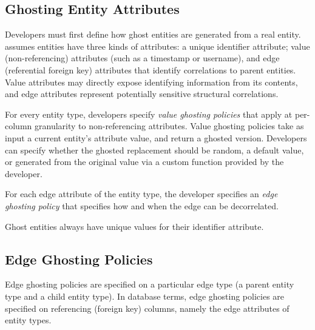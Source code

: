\subsection{Ghosting Entity Attributes}
Developers must first define how ghost entities are generated from a real entity.
\sys assumes entities have three kinds of attributes: a unique identifier attribute; 
value (non-referencing) attributes (such as a timestamp or username), and 
edge (referential foreign key) attributes that identify correlations to parent entities. 
Value attributes may directly expose identifying information from its
contents, and edge attributes represent potentially sensitive structural correlations. 

For every entity type, developers specify \emph{value ghosting policies} that apply at per-column
granularity to non-referencing attributes. Value ghosting policies take as input a current entity's
attribute value, and return a ghosted version. Developers can specify whether the ghosted
replacement should be random, a default value, or generated from the original value via a custom
function provided by the developer. 

For each edge attribute of the entity type, the developer specifies an 
\emph{edge ghosting policy} that specifies how and when the edge can be decorrelated.

Ghost entities always have unique values for their identifier attribute.

%

\subsection{Edge Ghosting Policies}
Edge ghosting policies are specified on a particular edge type (a parent entity type and a child
entity type). In database terms, edge ghosting policies are specified on referencing
(foreign key) columns, namely the edge attributes of entity types.

